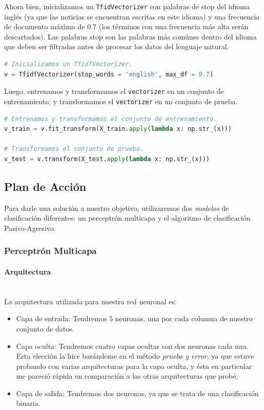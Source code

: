\documentclass[letterpaper,11pt]{article}
\newcommand{\subsubsubsection}[1]{\paragraph{#1}\mbox{}\\}
\begin{document}
Ahora bien, inicializamos un \texttt{TfidVectorizer} con palabras de stop  del 
idioma inglés (ya que las noticias se encuentran escritas en este idioma) y una
frecuencia de documento máxima de $0.7$ (los términos con una frecuencia más 
alta serán descartados). Las palabras stop son las palabras más comúnes dentro 
del idioma que deben ser filtradas antes de procesar los datos del lenguaje 
natural. 

\begin{lstlisting}[language = Python]
# Inicializamos un TfidfVectorizer. 
v = TfidfVectorizer(stop_words = 'english', max_df = 0.7)
\end{lstlisting}

Luego, entrenamos y transformamos el \texttt{vectorizer} en un conjunto de 
entrenamiento; y transformamos el \texttt{vectorizer} en un conjunto de prueba.
\begin{lstlisting}[language = Python]
# Entrenamos y transformamos el conjunto de entrenamiento.
v_train = v.fit_transform(X_train.apply(lambda x: np.str_(x))) 

# Transformamos el conjunto de prueba.
v_test = v.transform(X_test.apply(lambda x: np.str_(x)))
\end{lstlisting}

\subsection{Plan de Acción}
Para darle una solución a nuestro objetivo, utilizaremos dos \textit{modelos}
de clasificación diferentes: un perceptrón multicapa y el algoritmo de 
clasificación Pasivo-Agresivo.

\subsubsection{Perceptrón Multicapa}

\subsubsubsection{Arquitectura}
La arquitectura utilizada para nuestra red neuronal es:
\begin{itemize}
    \item Capa de entrada: Tendremos $5$ neuronas, una por cada columna de
    nuestro conjunto de datos. 

    \item Capa oculta: Tendremos cuatro capas ocultas con dos neuronas cada 
    una. Esta elección la hice basándome en el método \textit{prueba y error}, 
    ya que estuve probando con varias arquitecturas para la capa oculta, y 
    ésta en particular me pareció rápida en comparación a las otras 
    arquitecturas que probé. 

    \item Capa de salida: Tendremos dos neuronas, ya que se trata de una 
    clasificación binaria.
\end{itemize}
\end{document}
